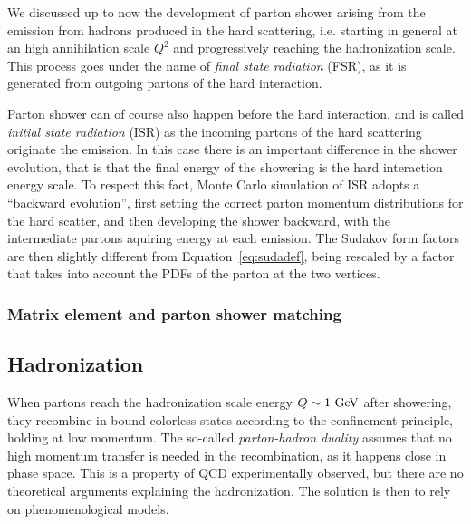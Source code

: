 We discussed up to now the development of parton shower arising
from the emission from hadrons produced in the hard scattering, i.e. 
starting in general at an high annihilation scale $Q^2$ and progressively
reaching the hadronization scale. This process goes under the name of
{\it final state radiation} (FSR), as it is generated from outgoing
partons of the hard interaction.

Parton shower can of course also happen before the hard interaction, and
is called {\it initial state radiation} (ISR) as the incoming partons
of the hard scattering originate the emission. In this case
there is an important difference in the shower evolution, that is
that the final energy of the showering is the hard interaction energy
scale. To respect this fact, Monte Carlo simulation of ISR adopts a 
``backward evolution'', first setting the correct parton momentum distributions
for the hard scatter, and then developing the shower backward, with the 
intermediate partons aquiring energy at each emission. The Sudakov form 
factors are then slightly different from Equation~\ref{eq:sudadef}, being
rescaled by a factor that takes into account the PDFs of the parton at the
two vertices.


\subsubsection{Matrix element and parton shower matching}\label{sec:matching}

\subsection{Hadronization}\label{sec:hadronization}

When partons reach the hadronization scale energy $Q\sim 1\gev$ after showering,
they recombine in bound colorless states according to the confinement
principle, holding at low momentum. The so-called {\it parton-hadron duality}
assumes that no high momentum transfer is needed in the recombination,
as it happens  close in phase space. This is a property of QCD
experimentally observed, but there are no theoretical arguments
explaining the hadronization. The solution is then to rely on
phenomenological models.

